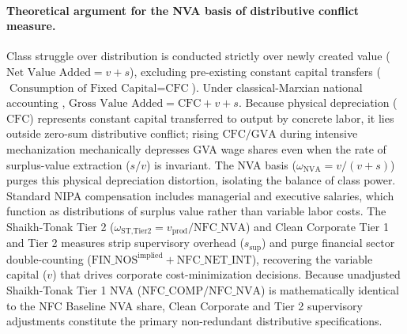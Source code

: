 \paragraph{Theoretical argument for the NVA basis of distributive conflict measure.}
Class struggle over distribution is conducted strictly over newly created value ($\text{Net Value Added} = v + s$), excluding pre-existing constant capital transfers ($\text{Consumption of Fixed Capital} = \text{CFC}$). Under classical-Marxian national accounting \citep{ShaikhTonak1994}, $\text{Gross Value Added} = \text{CFC} + v + s$. Because physical depreciation ($\text{CFC}$) represents constant capital transferred to output by concrete labor, it lies outside zero-sum distributive conflict; rising $\text{CFC}/\text{GVA}$ during intensive mechanization mechanically depresses GVA wage shares even when the rate of surplus-value extraction ($s/v$) is invariant. The NVA basis ($\omega_{\text{NVA}} = v / (v + s)$) purges this physical depreciation distortion, isolating the balance of class power. Standard NIPA compensation includes managerial and executive salaries, which function as distributions of surplus value rather than variable labor costs. The Shaikh-Tonak Tier 2 ($\omega_{\text{ST,Tier2}} = v_{\text{prod}} / \text{NFC\_NVA}$) and Clean Corporate Tier 1 and Tier 2 measures strip supervisory overhead ($s_{\text{sup}}$) and purge financial sector double-counting ($\text{FIN\_NOS}^{\text{implied}} + \text{NFC\_NET\_INT}$), recovering the variable capital ($v$) that drives corporate cost-minimization decisions. Because unadjusted Shaikh-Tonak Tier 1 NVA ($\text{NFC\_COMP} / \text{NFC\_NVA}$) is mathematically identical to the NFC Baseline NVA share, Clean Corporate and Tier 2 supervisory adjustments constitute the primary non-redundant distributive specifications.

